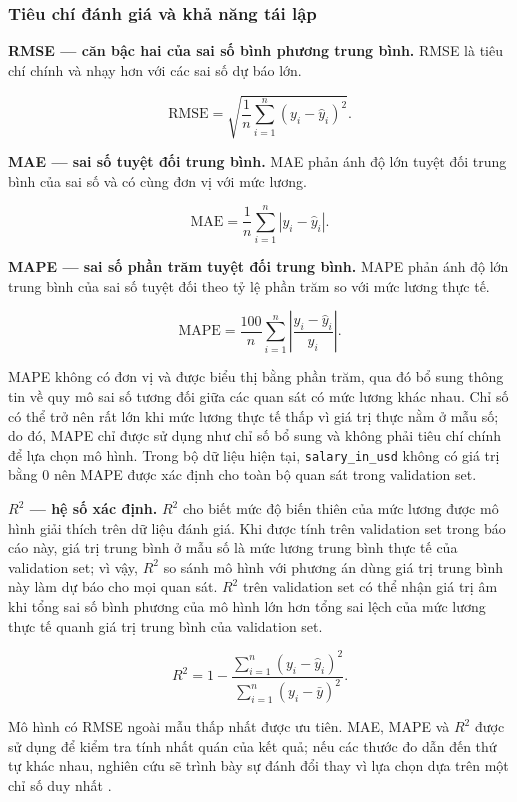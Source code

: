 \subsubsection{Tiêu chí đánh giá và khả năng tái
lập}\label{nghi:tiuxeau-chuxed-ux111uxe1nh-giuxe1-vuxe0-khux1ea3-nux103ng-tuxe1i-lux1eadp}

\textbf{RMSE --- căn bậc hai của sai số bình phương trung bình.} RMSE là
tiêu chí chính và nhạy hơn với các sai số dự báo lớn.

\[
\mathrm{RMSE} = \sqrt{\frac{1}{n}\sum_{i=1}^{n}\left(y_i-\hat{y}_i\right)^2}.
\]

\textbf{MAE --- sai số tuyệt đối trung bình.} MAE phản ánh độ lớn tuyệt
đối trung bình của sai số và có cùng đơn vị với mức lương.

\[
\mathrm{MAE} = \frac{1}{n}\sum_{i=1}^{n}\left|y_i-\hat{y}_i\right|.
\]

\textbf{MAPE --- sai số phần trăm tuyệt đối trung bình.} MAPE phản ánh
độ lớn trung bình của sai số tuyệt đối theo tỷ lệ phần trăm so với mức
lương thực tế.

\[
\mathrm{MAPE} = \frac{100}{n}\sum_{i=1}^{n}\left|\frac{y_i-\hat{y}_i}{y_i}\right|.
\]

MAPE không có đơn vị và được biểu thị bằng phần trăm, qua đó bổ sung
thông tin về quy mô sai số tương đối giữa các quan sát có mức lương khác
nhau. Chỉ số có thể trở nên rất lớn khi mức lương thực tế thấp vì giá
trị thực nằm ở mẫu số; do đó, MAPE chỉ được sử dụng như chỉ số bổ sung
và không phải tiêu chí chính để lựa chọn mô hình. Trong bộ dữ liệu hiện
tại, \texttt{salary\_in\_usd} không có giá trị bằng 0 nên MAPE được xác
định cho toàn bộ quan sát trong validation set.

\textbf{\(R^2\) --- hệ số xác định.} \(R^2\) cho biết mức độ biến thiên của mức
lương được mô hình giải thích trên dữ liệu đánh giá. Khi được tính trên
validation set trong báo cáo này, giá trị trung bình ở mẫu số là mức
lương trung bình thực tế của validation set; vì vậy, \(R^2\) so sánh mô hình
với phương án dùng giá trị trung bình này làm dự báo cho mọi quan sát.
\(R^2\) trên validation set có thể nhận giá trị âm khi tổng sai số bình
phương của mô hình lớn hơn tổng sai lệch của mức lương thực tế quanh giá
trị trung bình của validation set.

\[
R^2 = 1 - \frac{\sum_{i=1}^{n}\left(y_i-\hat{y}_i\right)^2}{\sum_{i=1}^{n}\left(y_i-\bar{y}\right)^2}.
\]

Mô hình có RMSE ngoài mẫu thấp nhất được ưu tiên. MAE, MAPE và \(R^2\) được
sử dụng để kiểm tra tính nhất quán của kết quả; nếu các thước đo dẫn đến
thứ tự khác nhau, nghiên cứu sẽ trình bày sự đánh đổi thay vì lựa chọn
dựa trên một chỉ số duy nhất \cite{james2021}.


